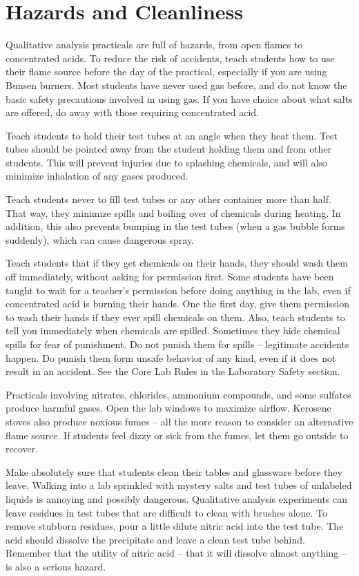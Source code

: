 \section{Hazards and Cleanliness}
Qualitative analysis practicals are full of hazards, 
from open flames to concentrated acids. 
To reduce the risk of accidents, 
teach students how to use their flame source 
before the day of the practical, 
especially if you are using Bunsen burners. 
Most students have never used gas before, 
and do not know the basic safety precautions involved in using gas. 
If you have choice about what salts are offered, 
do away with those requiring concentrated acid.

Teach students to hold their test tubes at an angle when they heat them. 
Test tubes should be pointed away from the student holding them 
and from other students. 
This will prevent injuries due to splashing chemicals, 
and will also minimize inhalation of any gases produced.

Teach students never to fill test tubes 
or any other container more than half. 
That way, 
they minimize spills and boiling over of chemicals during heating. 
In addition, 
this also prevents bumping in the test tubes 
(when a gas bubble forms suddenly), 
which can cause dangerous spray.

Teach students that if they get chemicals on their hands, 
they should wash them off immediately, 
without asking for permission first. 
Some students have been taught to wait for a teacher’s permission 
before doing anything in the lab, 
even if concentrated acid is burning their hands. 
One the first day, 
give them permission to wash their hands 
if they ever spill chemicals on them. 
Also, 
teach students to tell you immediately when chemicals are spilled. 
Sometimes they hide chemical spills for fear of punishment. 
Do not punish them for spills – legitimate accidents happen. 
Do punish them form unsafe behavior of any kind, 
even if it does not result in an accident. 
See the Core Lab Rules in the Laboratory Safety section.

Practicals involving nitrates, 
chlorides, 
ammonium compounds, 
and some sulfates produce harmful gases. 
Open the lab windows to maximize airflow. 
Kerosene stoves also produce noxious fumes – 
all the more reason to consider an alternative flame source. 
If students feel dizzy or sick from the fumes, 
let them go outside to recover.

Make absolutely sure that students clean their tables 
and glassware before they leave. 
Walking into a lab sprinkled with mystery salts 
and test tubes of unlabeled liquids is annoying and possibly dangerous. 
Qualitative analysis experiments can leave residues in test tubes 
that are difficult to clean with brushes alone. 
To remove stubborn residues, 
pour a little dilute nitric acid into the test tube. 
The acid should dissolve the precipitate 
and leave a clean test tube behind. 
Remember that the utility of nitric acid – 
that it will dissolve almost anything – is also a serious hazard.

